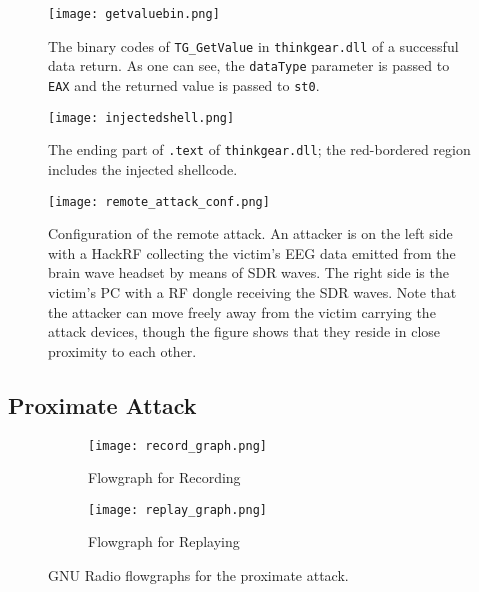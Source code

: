 \begin{figure}[!htb]
        \centering
        \texttt{[image: getvaluebin.png]}
        \caption{The binary codes of \texttt{TG\_GetValue} in \texttt{thinkgear.dll} of a successful data return. As one can see, the \texttt{dataType} parameter is passed to \texttt{EAX} and the returned value is passed to \texttt{st0}.}
        \label{fig:getvaluebin}
\end{figure}

\begin{figure}[!htb]
        \centering
        \texttt{[image: injectedshell.png]}
        \caption{The ending part of \texttt{.text} of \texttt{thinkgear.dll}; the red-bordered region includes the injected shellcode.}
        \label{fig:injectshell}
\end{figure}

\begin{figure}[!htb]
        \centering
        \texttt{[image: remote\_attack\_conf.png]}
        \caption{Configuration of the remote attack. An attacker is on the left side with a HackRF collecting the victim's EEG data emitted from the brain wave headset by means of SDR waves. The right side is the victim's PC with a RF dongle receiving the SDR waves. Note that the attacker can move freely away from the victim carrying the attack devices, though the figure shows that they reside in close proximity to each other.}
        \label{fig:remoteattackconf}
\end{figure}

\subsection{Proximate Attack} \label{sec:proximate:attack}

\begin{figure*}[!htb]
        \begin{subfigure}[t]{0.8\textwidth}
              \centering
          \texttt{[image: record\_graph.png]}
                \caption{Flowgraph for Recording}
                \label{fig:recordgraph}
        \end{subfigure}
        \begin{subfigure}[t]{0.8\textwidth}
              \centering
          \texttt{[image: replay\_graph.png]}
                \caption{Flowgraph for Replaying}
                \label{fig:replaygraph}
        \end{subfigure}%
         \caption{GNU Radio flowgraphs for the proximate attack.}
         \label{fig:gnuflowgraph}
\end{figure*}

